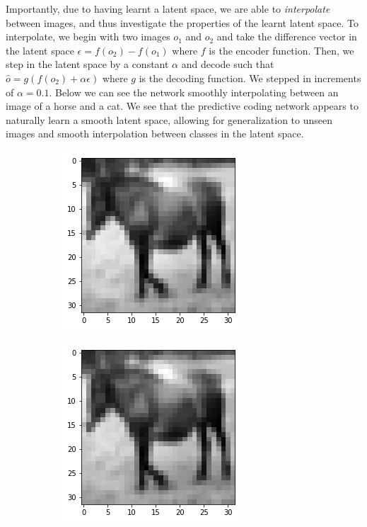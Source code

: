 Importantly, due to having learnt a latent space, we are able to \emph{interpolate} between images, and thus investigate the properties of the learnt latent space. To interpolate, we begin with two images $o_1$ and $o_2$ and take the difference vector in the latent space $\epsilon = f(o_2) - f(o_1)$ where $f$ is the encoder function. Then, we step in the latent space by a constant $\alpha$ and decode such that $\hat{o} = g(f(o_2) + \alpha \epsilon)$ where $g$ is the decoding function. We stepped in increments of $\alpha = 0.1$. Below we can see the network smoothly interpolating between an image of a horse and a cat. We see that the predictive coding network appears to naturally learn a smooth latent space, allowing for generalization to unseen images and smooth interpolation between classes in the latent space.
\begin{figure}[H]
\centering
\begin{subfigure}{.3\linewidth}
 \centering
 \includegraphics[scale=0.4]{chapter_3_figures/interp_2.png}
\end{subfigure}
 \hfill
\begin{subfigure}{.3\linewidth}
 \centering
 \includegraphics[scale=0.4]{chapter_3_figures/interp_3.png}

\end{subfigure}
\end{figure}

